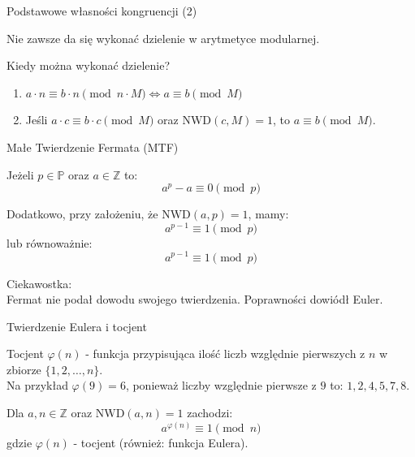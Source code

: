 \documentclass[polish,envcountsect,10pt]{beamer}
\begin{document}
\begin{frame}{Podstawowe własności kongruencji (2)}
    \begin{theorem}
    Nie zawsze da się wykonać dzielenie w arytmetyce modularnej.
    \end{theorem}

    Kiedy można wykonać dzielenie?
    \begin{enumerate}
        \item $a\cdot n \equiv b\cdot n \pmod{n\cdot M} \Leftrightarrow a \equiv b \pmod{M}$
        \item Jeśli $a\cdot c \equiv b\cdot c \pmod{M}$ oraz $\text{NWD}(c, M) = 1$, to $a \equiv b \pmod{M}$.
    \end{enumerate}

\end{frame}
%   


\begin{frame}{Małe Twierdzenie Fermata (MTF)}
    \begin{theorem}
    Jeżeli $p \in \mathbb{P}$ oraz $a \in \mathbb{Z}$ to: 
    \[ a^p - a \equiv 0 \pmod{p} \]
    \end{theorem}

    Dodatkowo, przy założeniu, że $\text{NWD}(a, p) = 1$, mamy:
    \[ a^{p-1} \equiv 1 \pmod{p} \]
    lub równoważnie:
    \[ a^{p - 1} \equiv 1 \pmod{p} \]

    Ciekawostka: \\
    Fermat nie podał dowodu swojego twierdzenia. Poprawności dowiódł Euler.
\end{frame}
%   


\begin{frame}{Twierdzenie Eulera i tocjent}
    \begin{definition}
    Tocjent $\varphi(n)$ - funkcja przypisująca ilość liczb względnie pierwszych z $n$ w zbiorze $\{1, 2, \ldots, n\}$.  
    \\
    Na przykład $\varphi(9) = 6$, ponieważ liczby względnie pierwsze z $9$ to: $1, 2, 4, 5, 7, 8$.
    \end{definition}
    
    \begin{theorem}
    Dla $a,n \in \mathbb{Z}$ oraz $\text{NWD}(a,n) = 1$ zachodzi:
    \[ a^{\varphi(n)} \equiv 1 \pmod{n} \]
    gdzie $\varphi(n)$ - tocjent (również: funkcja Eulera).
    \end{theorem}

\end{frame}
%  
\end{document}
